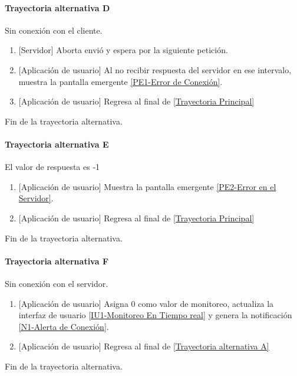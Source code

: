 \paragraph{Trayectoria alternativa D} \label{SUB-U-CU1.5:TD}
	Sin conexión con el cliente.
	\begin{enumerate}[label=D\arabic*.]
		\item {[Servidor]} Aborta envió y espera por la siguiente petición.
		\item {[Aplicación de usuario]} Al no recibir respuesta del servidor en ese intervalo, muestra la pantalla emergente \hyperref[fig:Error de Conexion]{[PE1-Error de Conexión]}.
		\item {[Aplicación de usuario]} Regresa al final de \hyperref[SUB-U-CU1.5:TP]{[Trayectoria Principal]}
	\end{enumerate}
	Fin de la trayectoria alternativa.
	
\paragraph{Trayectoria alternativa E} \label{SUB-U-CU1.5:TE}
	El valor de respuesta es -1
	\begin{enumerate}[label=E\arabic*.]
		\item {[Aplicación de usuario]} Muestra la pantalla emergente \hyperref[fig:Error en el Servidor]{[PE2-Error en el Servidor]}.
		\item {[Aplicación de usuario]} Regresa al final de \hyperref[SUB-U-CU1.5:TP]{[Trayectoria Principal]}
	\end{enumerate}
	Fin de la trayectoria alternativa.
	
\paragraph{Trayectoria alternativa F} \label{SUB-U-CU1.5:TF}
	Sin conexión con el servidor.
	\begin{enumerate}[label=F\arabic*.]
		\item {[Aplicación de usuario]} Asigna 0 como valor de monitoreo, actualiza la interfaz de usuario \hyperref[fig:monitoreo]{[IU1-Monitoreo En Tiempo real]}  y genera la notificación \hyperref[fig:Alerta Conexion]{[N1-Alerta de Conexión]}.
		\item {[Aplicación de usuario]} Regresa al final de \hyperref[SUB-U-CU1.5:TA]{[Trayectoria alternativa A]}
	\end{enumerate}
	Fin de la trayectoria alternativa.
	
